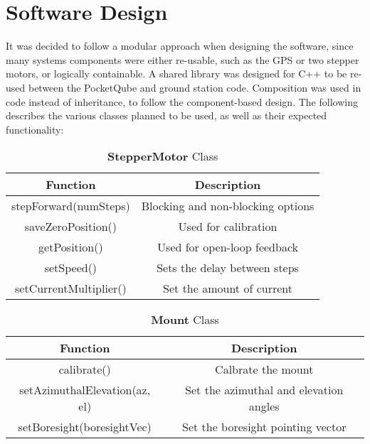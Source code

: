 \graphicspath{{./figures}}

\section{Software Design}

It was decided to follow a modular approach when designing the software, since many systems components were either re-usable, such as the GPS or two stepper motors, or logically containable. A shared library was designed for C++ to be re-used between the PocketQube and ground station code. Composition was used in code instead of inheritance, to follow the component-based design. The following describes the various classes planned to be used, as well as their expected functionality:

\begin{table}[!htb]
  \centering
  \renewcommand{\arraystretch}{1.2}
  \begin{tabular}{ |c|c| }
  \hline
  \textbf{Function}        & \textbf{Description}    \\
  \hline
    stepForward(numSteps)  & Blocking and non-blocking options \\
    saveZeroPosition() & Used for calibration \\
    getPosition() & Used for open-loop feedback \\
    setSpeed() & Sets the delay between steps \\
    setCurrentMultiplier() & Set the amount of current \\
  \hline
  \end{tabular}
  \caption{\textbf{StepperMotor} Class}
  \label{tab:stepperMotorUML}
\end{table}

\begin{table}[!htb]
  \centering
  \renewcommand{\arraystretch}{1.2}
  \begin{tabular}{ |c|c| }
  \hline
  \textbf{Function}        & \textbf{Description}    \\
  \hline
    calibrate()                         & Calbrate the mount \\
    setAzimuthalElevation(az, el)       & Set the azimuthal and elevation angles \\
    setBoresight(boresightVec)          & Set the boresight pointing vector \\
  \hline
  \end{tabular}
  \caption{\textbf{Mount} Class}
  \label{tab:mountUML}
\end{table}

